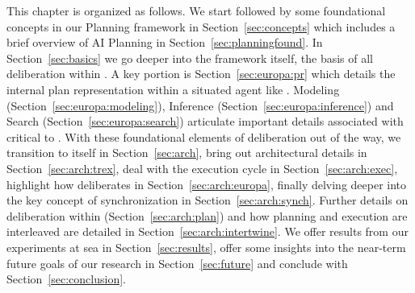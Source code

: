 This chapter is organized as follows. We start  followed by some foundational concepts in
our Planning framework in Section~\ref{sec:concepts} which includes a
brief overview of AI Planning in Section~\ref{sec:planningfound}. In
Section~\ref{sec:basics} we go deeper into the \eu framework itself,
the basis of all deliberation within \rxe. A key portion is
Section~\ref{sec:europa:pr} which details the internal plan
representation within a situated agent like \rxe. Modeling
(Section~\ref{sec:europa:modeling}), Inference
(Section~\ref{sec:europa:inference}) and Search
(Section~\ref{sec:europa:search}) articulate important details
associated with \eu critical to \rxe.  With these foundational
elements of deliberation out of the way, we transition to \rx itself
in Section~\ref{sec:arch}, bring out architectural details in
Section~\ref{sec:arch:trex}, deal with the execution cycle in
Section~\ref{sec:arch:exec}, highlight how \rx deliberates in
Section~\ref{sec:arch:europa}, finally delving deeper into the key
concept of synchronization in Section~\ref{sec:arch:synch}. Further
details on deliberation within \rx (Section~\ref{sec:arch:plan}) and
how planning and execution are interleaved are detailed in
Section~\ref{sec:arch:intertwine}. We offer results from our
experiments at sea in Section~\ref{sec:results}, offer some insights
into the near-term future goals of our research in
Section~\ref{sec:future} and conclude with
Section~\ref{sec:conclusion}.

